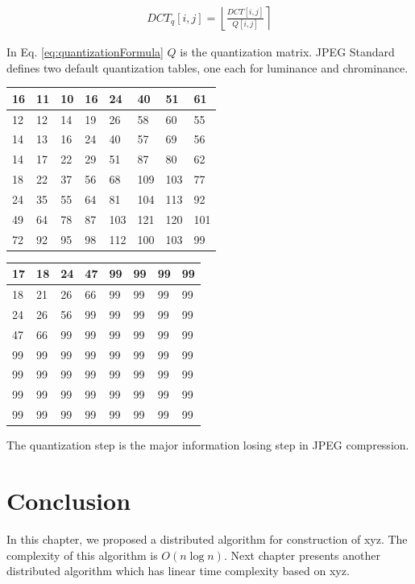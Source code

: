 \begin{equation}
    \begin{split}
        DCT_q[i,j] = \left \lfloor \frac{DCT[i,j]}{Q[i,j]} \right \rceil
    \end{split}
    \label{eq:quantizationFormula}
\end{equation}

In Eq. \ref{eq:quantizationFormula} $Q$ is the quantization matrix. JPEG Standard defines two default quantization tables, one each for luminance and chrominance.

\begingroup
\centering
    \begin{tabular}{|l|l|l|l|l|l|l|l|}
    \hline
    16 & 11 & 10 & 16 & 24  & 40  & 51  & 61  \\ \hline
    12 & 12 & 14 & 19 & 26  & 58  & 60  & 55  \\ \hline
    14 & 13 & 16 & 24 & 40  & 57  & 69  & 56  \\ \hline
    14 & 17 & 22 & 29 & 51  & 87  & 80  & 62  \\ \hline
    18 & 22 & 37 & 56 & 68  & 109 & 103 & 77  \\ \hline
    24 & 35 & 55 & 64 & 81  & 104 & 113 & 92  \\ \hline
    49 & 64 & 78 & 87 & 103 & 121 & 120 & 101 \\ \hline
    72 & 92 & 95 & 98 & 112 & 100 & 103 & 99  \\ \hline
    \end{tabular}
    \label{tbl:LuminanceQuantTable}
\endgroup

\vspace{2em}

\begingroup
\centering
    \begin{tabular}{|l|l|l|l|l|l|l|l|}
    \hline
    17 & 18 & 24 & 47 & 99 & 99 & 99 & 99 \\ \hline
    18 & 21 & 26 & 66 & 99 & 99 & 99 & 99 \\ \hline
    24 & 26 & 56 & 99 & 99 & 99 & 99 & 99 \\ \hline
    47 & 66 & 99 & 99 & 99 & 99 & 99 & 99 \\ \hline
    99 & 99 & 99 & 99 & 99 & 99 & 99 & 99 \\ \hline
    99 & 99 & 99 & 99 & 99 & 99 & 99 & 99 \\ \hline
    99 & 99 & 99 & 99 & 99 & 99 & 99 & 99 \\ \hline
    99 & 99 & 99 & 99 & 99 & 99 & 99 & 99 \\ \hline
    \end{tabular}
    \label{tbl:ChrominanceQuantTable}
\endgroup

The quantization step is the major information losing step in JPEG
compression.

\section{Conclusion}
In this chapter, we proposed a distributed algorithm
for construction of xyz.
The complexity of this algorithm is $O(n \log n)$.
Next chapter presents
another distributed algorithm which has linear time 
complexity based on xyz.

